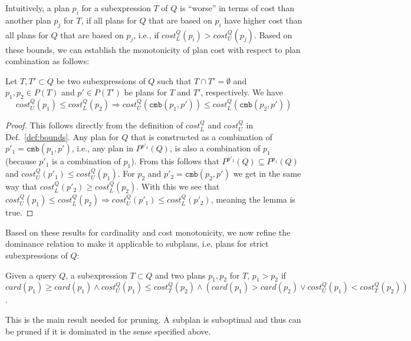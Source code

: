 Intuitively, a plan $p_i$ for a subexpression $T$ of $Q$ is ``worse''
in terms of cost than another plan $p_j$ for $T$, if all plans for $Q$
that are based on $p_i$ have higher cost than all plans for $Q$ that
are based on $p_j$, i.e., if $cost_L^Q(p_i) > cost_U^Q(p_j)$. Based on
these bounds, we can establish the monotonicity of plan cost with
respect to plan combination as follows:
  
\begin{lemma}
  Let $T,T' \subset Q$ be two subexpressions of $Q$ such that $T \cap
  T' = \emptyset$ and $p_1,p_2 \in P(T)$ and $p' \in P(T')$ be plans
  for $T$ and $T'$, respectively. We have
    \[ cost^Q_U(p_1) \leq cost^Q_L(p_2) \Rightarrow
    cost^Q_U(\mathtt{cmb}(p_1,p')) \leq
    cost^Q_L(\mathtt{cmb}(p_2,p')) \]
\end{lemma}
\begin{proof}
  This follows directly from the definition of $cost^Q_L$ and
  $cost^Q_U$ in Def.~\ref{def:bounds}. Any plan for $Q$ that is
  constructed as a combination of $p'_1 = \mathtt{cmb}(p_1,p')$, i.e.,
  any plan in $P^{p'_1}(Q)$, is also a combination of $p_1$ (because
  $p'_1$ is a combination of $p_1$). From this follows that
  $P^{p'_1}(Q) \subseteq P^{p_1}(Q)$ and $cost^Q_U(p'_1) \leq
  cost^Q_U(p_1)$. For $p_2$ and $p'_2 = \mathtt{cmb}(p_2,p')$ we get
  in the same way that $cost^Q_L(p'_2) \geq cost^Q_L(p_2)$. With this
  we see that $cost^Q_U(p_1) \leq cost^Q_L(p_2) \Rightarrow
  cost^Q_U(p'_1) \leq cost^Q_L(p'_2)$, meaning the lemma is true.
\end{proof}

Based on these results for cardinality and cost monotonicity, we now
refine the dominance relation to make it applicable to subplans,
i.e. plans for strict subexpressions of $Q$:

\begin{theorem}
  \label{def:dominates_bound}
  Given a query $Q$, a subexpression $T \subset Q$ and two plans
  $p_1,p_2$ for $T$, $p_1 > p_2$ if
  $card(p_1) \geq card(p_1) \wedge cost_U^Q(p_1) \leq cost_T^Q(p_2)
  \wedge (card(p_1) > card(p_2) \vee cost_U^Q(p_1) < cost_T^Q(p_2))$.
\end{theorem}

This is the main result needed for pruning. A subplan is suboptimal
and thus can be pruned if it is dominated in the sense specified
above.


